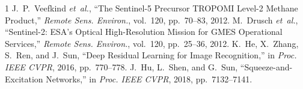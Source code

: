 \documentclass[journal]{IEEEtran}
\begin{document}
\begin{thebibliography}{1}
J.~P.~Veefkind \textit{et~al.}, ``The Sentinel-5 Precursor TROPOMI Level-2 Methane Product,'' \textit{Remote Sens. Environ.}, vol.~120, pp.~70--83, 2012.
M.~Drusch \textit{et~al.}, ``Sentinel-2: ESA's Optical High-Resolution Mission for GMES Operational Services,'' \textit{Remote Sens. Environ.}, vol.~120, pp.~25--36, 2012.
K.~He, X.~Zhang, S.~Ren, and J.~Sun, ``Deep Residual Learning for Image Recognition,'' in \textit{Proc. IEEE CVPR}, 2016, pp.~770--778.
J.~Hu, L.~Shen, and G.~Sun, ``Squeeze-and-Excitation Networks,'' in \textit{Proc. IEEE CVPR}, 2018, pp.~7132--7141.
\end{thebibliography}
\end{document}
